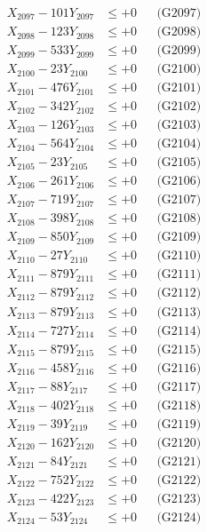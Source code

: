 \documentclass[a4paper,10pt]{article}
\begin{document}
{\begin{align}
X_{2097} - 101Y_{2097} &\leq +0 && \text{(G2097)} \\
X_{2098} - 123Y_{2098} &\leq +0 && \text{(G2098)} \\
X_{2099} - 533Y_{2099} &\leq +0 && \text{(G2099)} \\
X_{2100} - 23Y_{2100} &\leq +0 && \text{(G2100)} \\
\allowbreak
X_{2101} - 476Y_{2101} &\leq +0 && \text{(G2101)} \\
X_{2102} - 342Y_{2102} &\leq +0 && \text{(G2102)} \\
X_{2103} - 126Y_{2103} &\leq +0 && \text{(G2103)} \\
X_{2104} - 564Y_{2104} &\leq +0 && \text{(G2104)} \\
X_{2105} - 23Y_{2105} &\leq +0 && \text{(G2105)} \\
X_{2106} - 261Y_{2106} &\leq +0 && \text{(G2106)} \\
X_{2107} - 719Y_{2107} &\leq +0 && \text{(G2107)} \\
X_{2108} - 398Y_{2108} &\leq +0 && \text{(G2108)} \\
X_{2109} - 850Y_{2109} &\leq +0 && \text{(G2109)} \\
X_{2110} - 27Y_{2110} &\leq +0 && \text{(G2110)} \\
\allowbreak
X_{2111} - 879Y_{2111} &\leq +0 && \text{(G2111)} \\
X_{2112} - 879Y_{2112} &\leq +0 && \text{(G2112)} \\
X_{2113} - 879Y_{2113} &\leq +0 && \text{(G2113)} \\
X_{2114} - 727Y_{2114} &\leq +0 && \text{(G2114)} \\
X_{2115} - 879Y_{2115} &\leq +0 && \text{(G2115)} \\
X_{2116} - 458Y_{2116} &\leq +0 && \text{(G2116)} \\
X_{2117} - 88Y_{2117} &\leq +0 && \text{(G2117)} \\
X_{2118} - 402Y_{2118} &\leq +0 && \text{(G2118)} \\
X_{2119} - 39Y_{2119} &\leq +0 && \text{(G2119)} \\
X_{2120} - 162Y_{2120} &\leq +0 && \text{(G2120)} \\
\allowbreak
X_{2121} - 84Y_{2121} &\leq +0 && \text{(G2121)} \\
X_{2122} - 752Y_{2122} &\leq +0 && \text{(G2122)} \\
X_{2123} - 422Y_{2123} &\leq +0 && \text{(G2123)} \\
X_{2124} - 53Y_{2124} &\leq +0 && \text{(G2124)} \\

\end{align}}
\end{document}
